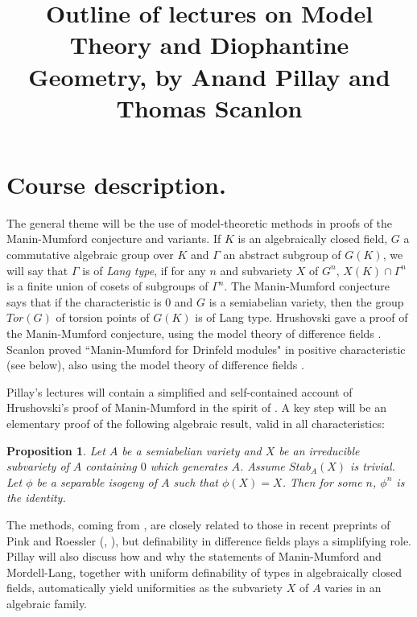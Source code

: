 \title{Outline of lectures on Model Theory and
Diophantine Geometry, by Anand Pillay and
Thomas Scanlon}
\date{ }
\newtheorem{Theorem}{Theorem}[section]
\newtheorem{Proposition}[Theorem]{Proposition}
\newtheorem{Definition}[Theorem]{Definition}
\newtheorem{Remark}[Theorem]{Remark}
\newtheorem{Lemma}[Theorem]{Lemma}
\newtheorem{Corollary}[Theorem]{Corollary}
\newtheorem{Fact}[Theorem]{Fact}
\newtheorem{Conjecture}[Theorem]{Conjecture}

\maketitle

\section{Course description.}
The general theme will be the use of
model-theoretic methods in proofs of the
Manin-Mumford conjecture and variants.
\newline
If $K$ is an algebraically closed field, $G$ a
commutative algebraic group over $K$ and
$\Gamma$ an abstract subgroup of $G(K)$, we
will say that $\Gamma$ is of {\em Lang type},
if for any $n$ and subvariety $X$ of $G^{n}$,
$X(K)\cap \Gamma^{n}$ is a finite union of
cosets of subgroups of $\Gamma^{n}$. The
Manin-Mumford conjecture says that if the
characteristic is $0$ and $G$ is a semiabelian
variety, then the group $Tor(G)$ of torsion
points of $G(K)$ is of Lang type.
\newline
Hrushovski \cite{Hrushovski-MM} gave a proof of
the Manin-Mumford conjecture, using the model
theory of difference fields \cite{C-H}.
Scanlon
\cite{Scanlon} proved ``Manin-Mumford for
Drinfeld modules" in positive characteristic
(see below), also using the model theory of
difference fields \cite{C-H-P}.

\vspace{5mm}
\noindent
Pillay's lectures will contain a simplified
and self-contained account of
Hrushovski's proof of Manin-Mumford in the
spirit of \cite{Pillay}.  A key step will be an
elementary proof of the following algebraic
result, valid in all characteristics:
\begin{Proposition} Let $A$ be a semiabelian
variety and $X$ be an irreducible subvariety of
$A$ containing $0$ which generates $A$. Assume
$Stab_{A}(X)$ is trivial. Let
$\phi$ be a separable isogeny of $A$ such that
$\phi(X) = X$. Then for some $n$, $\phi^{n}$
is the identity.
\end{Proposition}
The methods, coming from
\cite{Pillay-Ziegler}, are closely related to
those in recent preprints of Pink and Roessler
(\cite{Pink-Roessler1},
\cite{Pink-Roessler2}), but definability in
difference fields plays a simplifying role.
\newline
Pillay will also discuss how and why the
statements of Manin-Mumford and
Mordell-Lang, together with uniform
definability of types in algebraically closed
fields, automatically yield uniformities as
the subvariety $X$ of $A$ varies in an
algebraic family.

